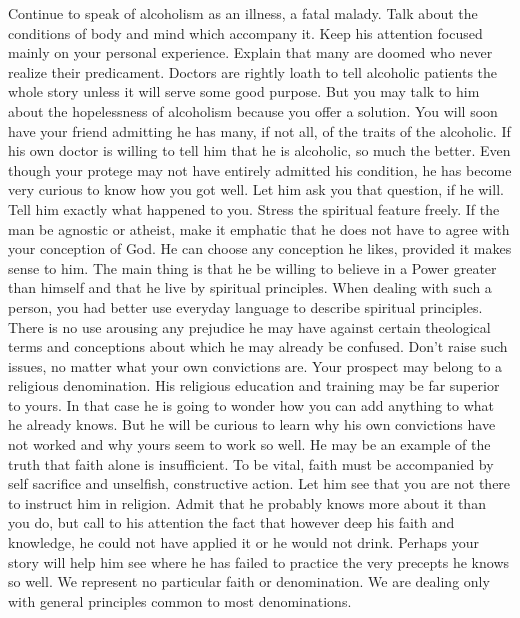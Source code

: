 \begin{biblechapter}
Continue to speak of alcoholism as an illness, a fatal malady.  Talk about the conditions of body and mind which accompany it.  Keep his attention focused mainly on your personal experience.  Explain that many are doomed who never realize their predicament.  Doctors are rightly loath to tell alcoholic patients the whole story unless it will serve some good purpose.  But you may talk to him about the hopelessness of alcoholism because you offer a solution.  You will soon have your friend admitting he has many, if not all, of the traits of the alcoholic.  If his own doctor is willing to tell him that he is alcoholic, so much the better.  Even though your protege may not have entirely admitted his condition, he has become very curious to know how you got well.  Let him ask you that question, if he will.  Tell him exactly what happened to you.  Stress the spiritual feature freely.  If the man be agnostic or atheist, make it emphatic that he does not have to agree with your conception of God.  He can choose any conception he likes, provided it makes sense to him.  The main thing is that he be willing to believe in a Power greater than himself and that he live by spiritual principles.
When dealing with such a person, you had better use everyday language to describe spiritual principles.  There is no use arousing any prejudice he may have against certain theological terms and conceptions about which he may already be confused.  Don't raise such issues, no matter what your own convictions are.
Your prospect may belong to a religious denomination.  His religious education and training may be far superior to yours.  In that case he is going to wonder how you can add anything to what he already knows.  But he will be curious to learn why his own convictions have not worked and why yours seem to work so well.  He may be an example of the truth that faith alone is insufficient.  To be vital, faith must be accompanied by self sacrifice and unselfish, constructive action.  Let him see that you are not there to instruct him in religion.  Admit that he probably knows more about it than you do, but call to his attention the fact that however deep his faith and knowledge, he could not have applied it or he would not drink.  Perhaps your story will help him see where he has failed to practice the very precepts he knows so well.  We represent no particular faith or denomination.  We are dealing only with general principles common to most denominations.

\end{biblechapter}
